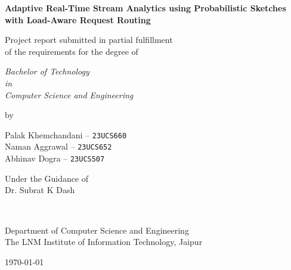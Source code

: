\thispagestyle{empty}
\begin{center}
{\Large \bf Adaptive Real-Time Stream Analytics using Probabilistic Sketches with Load-Aware Request Routing}

\vspace*{1.75cm}
{\large Project report submitted in partial fulfillment\\}
{\large of the requirements for the degree of \\}

\vspace*{1cm}
{\it {\large Bachelor of Technology} \\
{\large in\\}
{\large Computer Science and Engineering \\}}

\vspace*{1cm}
{\large by}

\vspace*{1cm}
{\large Palak Khemchandani \quad -- \quad \texttt{23UCS660} \\}
{\large Naman Aggrawal \quad -- \quad \texttt{23UCS652} \\}
{\large Abhinav Dogra \quad -- \quad \texttt{23UCS507} \\}

\vspace*{5mm}
{\large Under the Guidance of \\}
{\large Dr. Subrat K Dash \\}

\vspace*{1.0cm}
{\\}

\vspace*{2.0cm}
{\large Department of Computer Science and Engineering \\}
{\large The LNM Institute of Information Technology, Jaipur\\}

\vspace*{1.0cm}
{\large \today\\}
\end{center}

\clearpage
